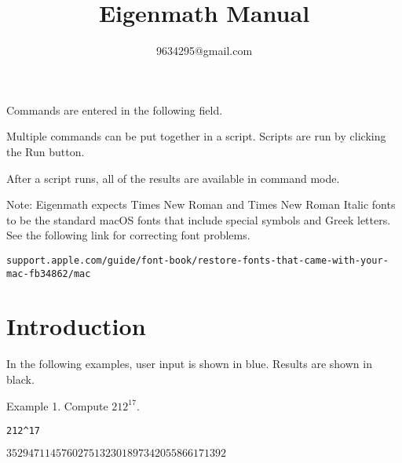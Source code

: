 \documentclass[12pt]{article}
\title{Eigenmath Manual}
\author{9634295@gmail.com}
\date{}
\begin{document}
\maketitle
\newpage
\tableofcontents
\newpage

Commands are entered in the following field.

\begin{center}
\end{center}

Multiple commands can be put together in a script.
Scripts are run by clicking the Run button.

\begin{center}
\end{center}

After a script runs, all of the results are available in command mode.

\iffalse
\bigskip
To print or copy results, click in the result field.
Then press \cmd$\,$P to print, \cmd$\,$C to copy to the clipboard.
\fi

\bigskip
Note: Eigenmath expects Times New Roman and Times New Roman Italic fonts
to be the standard macOS fonts that include special symbols and Greek letters.
See the following link for correcting font problems.

\bigskip
{\footnotesize\verb$support.apple.com/guide/font-book/restore-fonts-that-came-with-your-mac-fb34862/mac$}

\newpage

\section{Introduction}

In the following examples, user input is shown in blue.
Results are shown in black.

\bigskip
Example 1. Compute $212^{17}$.

{\color{blue}
\begin{verbatim}
212^17
\end{verbatim}}

$3529471145760275132301897342055866171392$
\end{document}
